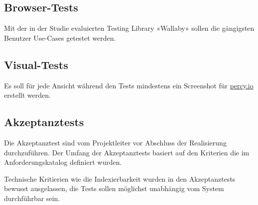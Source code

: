 \subsection{Browser-Tests}\label{browsertests}

Mit der in der Studie evaluierten Testing Library «Wallaby» sollen die
gängigsten Benutzer Use-Cases getestet werden.

\subsection{Visual-Tests}\label{visualtests}

Es soll für jede Ansicht während den Tests mindestens ein Screenshot für
\href{https://percy.io/}{percy.io} erstellt werden.

\clearpage
\subsection{Akzeptanztests}\label{akzeptanztests}

Die Akzeptanztest sind vom Projektleiter vor Abschluss der Realisierung
durchzuführen. Der Umfang der Akzeptanztests basiert auf den Kriterien die im
Anforderungskatalog definiert wurden.

Technische Kritierien wie die Indexierbarkeit wurden in den Akzeptanztests
bewusst ausgelassen, die Tests sollen möglichst unabhängig vom System
durchführbar sein.



